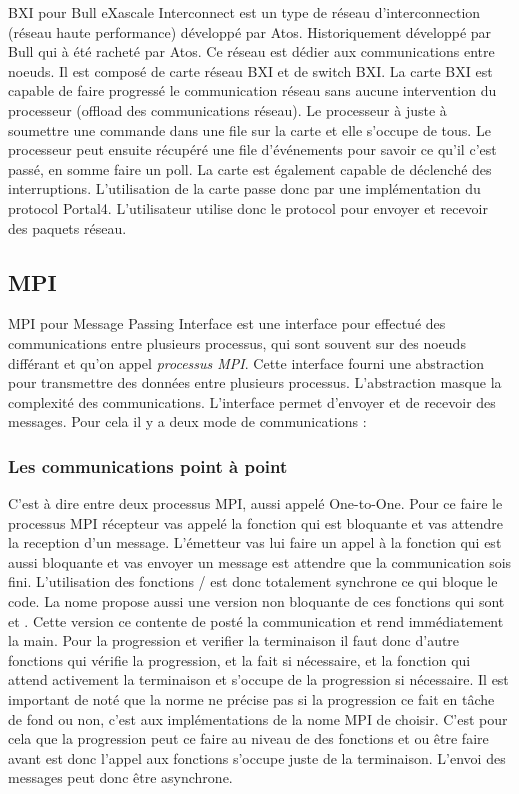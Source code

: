 BXI pour Bull eXascale Interconnect est un type de réseau d'interconnection (réseau haute performance) développé par Atos.
Historiquement développé par Bull qui à été racheté par Atos.
Ce réseau est dédier aux communications entre noeuds. Il est composé de carte réseau BXI et de switch BXI.
La carte BXI est capable de faire progressé le communication réseau sans aucune intervention du processeur (offload des communications réseau).
Le processeur à juste à soumettre une commande dans une file sur la carte et elle s'occupe de tous.
Le processeur peut ensuite récupéré une file d'événements pour savoir ce qu'il c'est passé, en somme faire un poll.
La carte est également capable de déclenché des interruptions.
L'utilisation de la carte passe donc par une implémentation du protocol Portal4.
L'utilisateur utilise donc le protocol pour envoyer et recevoir des paquets réseau.

\subsection{MPI}

MPI pour Message Passing Interface est une interface pour effectué des communications entre plusieurs processus, qui sont souvent sur des noeuds différant et qu'on appel \emph{processus MPI}.
Cette interface fourni une abstraction pour transmettre des données entre plusieurs processus.
L'abstraction masque la complexité des communications.
L'interface permet d'envoyer et de recevoir des messages. Pour cela il y a deux mode de communications :

\subsubsection{Les communications point à point}

C'est à dire entre deux processus MPI, aussi appelé One-to-One.
Pour ce faire le processus MPI récepteur vas appelé la fonction  qui est bloquante et vas attendre la reception d'un message.
L'émetteur vas lui faire un appel à la fonction  qui est aussi bloquante et vas envoyer un message est attendre que la communication sois fini.
L'utilisation des fonctions  /  est donc totalement synchrone ce qui bloque le code.
La nome propose aussi une version non bloquante de ces fonctions qui sont  et .
Cette version ce contente de posté la communication et rend immédiatement la main.
Pour la progression et verifier la terminaison il faut donc d'autre fonctions  qui vérifie la progression, et la fait si nécessaire, et la fonction  qui attend activement la terminaison et s'occupe de la progression si nécessaire.
Il est important de noté que la norme ne précise pas si la progression ce fait en tâche de fond ou non, c'est aux implémentations de la nome MPI de choisir.
C'est pour cela que la progression peut ce faire au niveau de des fonctions  et  ou être faire avant est donc l'appel aux fonctions s'occupe juste de la terminaison.
L'envoi des messages peut donc être asynchrone.

